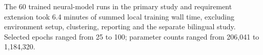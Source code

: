 The 60 trained neural-model runs in the primary study and requirement extension took 6.4 minutes of summed local training wall time, excluding environment setup, clustering, reporting and the separate bilingual study. Selected epochs ranged from 25 to 100; parameter counts ranged from 206,041 to 1,184,320.
